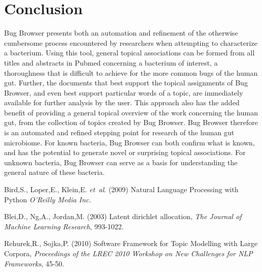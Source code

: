 \documentclass{bioinfo}
\begin{document}
\section{Conclusion}
Bug Browser presents both an automation and refinement of the otherwise cumbersome process encountered by researchers when attempting to characterize a bacterium. Using this tool, general topical associations can be formed from all titles and abstracts in Pubmed concerning a bacterium of interest, a thoroughness that is difficult to achieve for the more common bugs of the human gut. Further, the documents that best support the topical assignments of Bug Browser, and even best support particular words of a topic, are immediately available for further analysis by the user. This approach also has the added benefit of providing a general topical overview of the work concerning the human gut, from the collection of topics created by Bug Browser. Bug Browser therefore is an automated and refined stepping point for research of the human gut microbiome. For known bacteria, Bug Browser can both confirm what is known, and has the potential to generate novel or surprising topical associations. For unknown bacteria, Bug Browser can serve as a basis for understanding the general nature of these bacteria.

%
%
%
%
%
%
%
%
%


\begin{thebibliography}{}
Bird,S., Loper,E., Klein,E.  \textit{et~al}. (2009) Natural Language Processing with Python \textit{O'Reilly Media Inc.}

Blei,D., Ng,A., Jordan,M. (2003) Latent dirichlet allocation, {\it The Journal of Machine Learning Research}, 993-1022.

Rehurek,R., Sojka,P. (2010) Software Framework for Topic Modelling with Large Corpora, {\it Proceedings of the LREC 2010 Workshop on New Challenges for NLP Frameworks}, 45-50.

\end{thebibliography}
\end{document}
